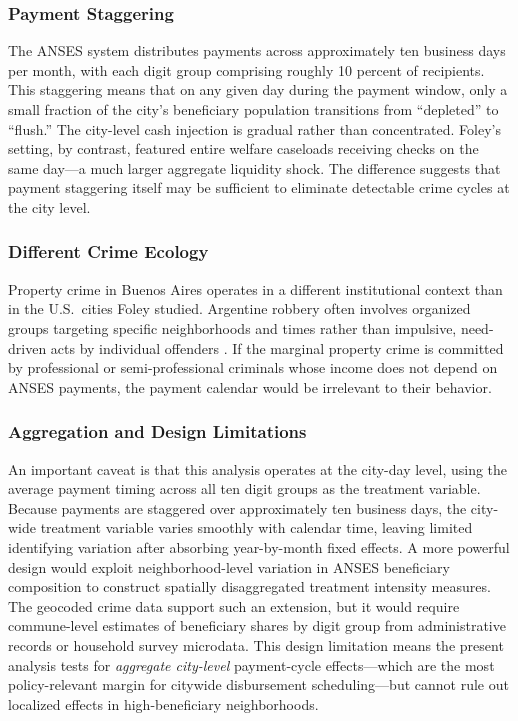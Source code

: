 \documentclass[12pt]{article}
\begin{document}
\subsubsection*{Payment Staggering} The ANSES system distributes payments across approximately ten business days per month, with each digit group comprising roughly 10 percent of recipients. This staggering means that on any given day during the payment window, only a small fraction of the city's beneficiary population transitions from ``depleted'' to ``flush.'' The city-level cash injection is gradual rather than concentrated. Foley's setting, by contrast, featured entire welfare caseloads receiving checks on the same day---a much larger aggregate liquidity shock. The difference suggests that payment staggering itself may be sufficient to eliminate detectable crime cycles at the city level.

\subsubsection*{Different Crime Ecology} Property crime in Buenos Aires operates in a different institutional context than in the U.S.\ cities Foley studied. Argentine robbery often involves organized groups targeting specific neighborhoods and times rather than impulsive, need-driven acts by individual offenders \citep{jaitman2017, di2004}. If the marginal property crime is committed by professional or semi-professional criminals whose income does not depend on ANSES payments, the payment calendar would be irrelevant to their behavior.

\subsubsection*{Aggregation and Design Limitations} An important caveat is that this analysis operates at the city-day level, using the average payment timing across all ten digit groups as the treatment variable. Because payments are staggered over approximately ten business days, the city-wide treatment variable varies smoothly with calendar time, leaving limited identifying variation after absorbing year-by-month fixed effects. A more powerful design would exploit neighborhood-level variation in ANSES beneficiary composition to construct spatially disaggregated treatment intensity measures. The geocoded crime data support such an extension, but it would require commune-level estimates of beneficiary shares by digit group from administrative records or household survey microdata. This design limitation means the present analysis tests for \textit{aggregate city-level} payment-cycle effects---which are the most policy-relevant margin for citywide disbursement scheduling---but cannot rule out localized effects in high-beneficiary neighborhoods.
\end{document}
